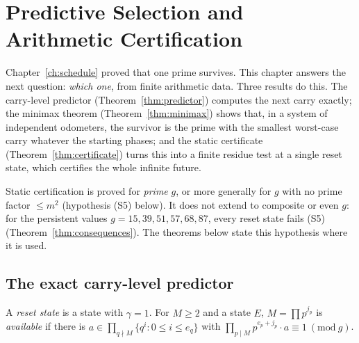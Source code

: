 \chapter{Predictive Selection and Arithmetic Certification}\label{ch:select}

Chapter~\ref{ch:schedule} proved that one prime survives. This chapter answers the next question: \emph{which one}, from finite arithmetic data. Three results do this. The carry-level predictor (Theorem~\ref{thm:predictor}) computes the next carry exactly; the minimax theorem (Theorem~\ref{thm:minimax}) shows that, in a system of independent odometers, the survivor is the prime with the smallest worst-case carry whatever the starting phases; and the static certificate (Theorem~\ref{thm:certificate}) turns this into a finite residue test at a single reset state, which certifies the whole infinite future.

\begin{remark}\label{rem:certscope}
Static certification is proved for \emph{prime} \(g\), or more generally for \(g\) with no prime factor \(\le m^2\) (hypothesis (S5) below). It does not extend to composite or even \(g\): for the persistent values \(g=15,39,51,57,68,87\), every reset state fails (S5) (Theorem~\ref{thm:consequences}). The theorems below state this hypothesis where it is used.
\end{remark}

\section{The exact carry-level predictor}

A \emph{reset state} is a state with \(\gamma=1\). For \(M\ge2\) and a state \(E\), \(M=\prod p^{j_p}\) is \emph{available} if there is \(a\in\prod_{q\nmid M}\{q^i:0\le i\le e_q\}\) with \(\prod_{p\mid M}p^{e_p+j_p}\cdot a\equiv1\ (\mathrm{mod}\ g)\).

